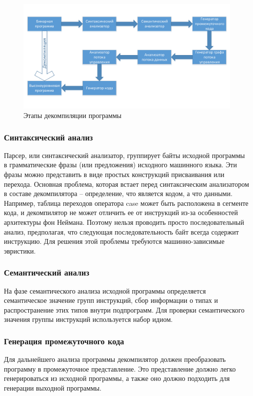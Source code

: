 \documentclass[14pt]{extarticle}
\begin{document}
\begin{figure}[H]
\includegraphics[width=1\linewidth]{work.pdf}   
\caption{Этапы декомпиляции программы}
\end{figure}

\subsubsection*{Синтаксический анализ} 
Парсер, или синтаксический анализатор, группирует байты исходной программы в грамматические фразы (или предложения) исходного машинного языка. Эти фразы можно представить в виде простых конструкций присваивания или перехода.
Основная проблема, которая встает перед синтаксическим анализатором в составе декомпилятора – определение, что является кодом, а что данными. Например, таблица переходов оператора case может быть расположена в сегменте кода, и декомпилятор не может отличить ее от инструкций из-за особенностей архитектуры фон Неймана. Поэтому нельзя проводить просто последовательный анализ, предполагая, что следующая последовательность байт всегда содержит инструкцию. Для решения этой проблемы требуются машинно-зависимые эвристики.
\subsubsection*{Семантический анализ}
На фазе семантического анализа исходной программы определяется семантическое значение групп инструкций, сбор информации о типах и распространение этих типов внутри подпрограмм. Для проверки семантического значения группы инструкций используется набор идиом.
\subsubsection*{Генерация промежуточного кода} 
Для дальнейшего анализа программы декомпилятор должен преобразовать программу в промежуточное представление. Это представление должно легко генерироваться из исходной программы, а также оно должно подходить для генерации выходной программы.
\end{document}
